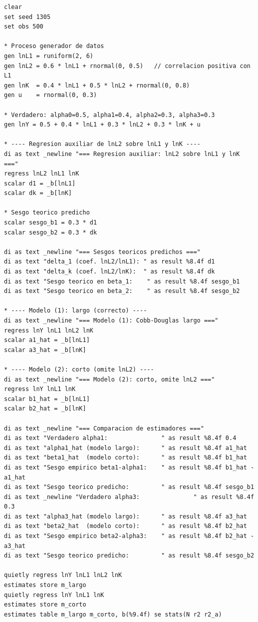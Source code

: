 \documentclass[12pt, letterpaper]{article}
\begin{document}
\begin{lstlisting}[caption={Simulación del sesgo por variable omitida ($\alpha_2 = 0.3$)}]
clear
set seed 1305
set obs 500

* Proceso generador de datos
gen lnL1 = runiform(2, 6)
gen lnL2 = 0.6 * lnL1 + rnormal(0, 0.5)   // correlacion positiva con L1
gen lnK  = 0.4 * lnL1 + 0.5 * lnL2 + rnormal(0, 0.8)
gen u    = rnormal(0, 0.3)

* Verdadero: alpha0=0.5, alpha1=0.4, alpha2=0.3, alpha3=0.3
gen lnY = 0.5 + 0.4 * lnL1 + 0.3 * lnL2 + 0.3 * lnK + u

* ---- Regresion auxiliar de lnL2 sobre lnL1 y lnK ----
di as text _newline "=== Regresion auxiliar: lnL2 sobre lnL1 y lnK ==="
regress lnL2 lnL1 lnK
scalar d1 = _b[lnL1]
scalar dk = _b[lnK]

* Sesgo teorico predicho
scalar sesgo_b1 = 0.3 * d1
scalar sesgo_b2 = 0.3 * dk

di as text _newline "=== Sesgos teoricos predichos ==="
di as text "delta_1 (coef. lnL2/lnL1): " as result %8.4f d1
di as text "delta_k (coef. lnL2/lnK):  " as result %8.4f dk
di as text "Sesgo teorico en beta_1:    " as result %8.4f sesgo_b1
di as text "Sesgo teorico en beta_2:    " as result %8.4f sesgo_b2

* ---- Modelo (1): largo (correcto) ----
di as text _newline "=== Modelo (1): Cobb-Douglas largo ==="
regress lnY lnL1 lnL2 lnK
scalar a1_hat = _b[lnL1]
scalar a3_hat = _b[lnK]

* ---- Modelo (2): corto (omite lnL2) ----
di as text _newline "=== Modelo (2): corto, omite lnL2 ==="
regress lnY lnL1 lnK
scalar b1_hat = _b[lnL1]
scalar b2_hat = _b[lnK]

di as text _newline "=== Comparacion de estimadores ==="
di as text "Verdadero alpha1:               " as result %8.4f 0.4
di as text "alpha1_hat (modelo largo):      " as result %8.4f a1_hat
di as text "beta1_hat  (modelo corto):      " as result %8.4f b1_hat
di as text "Sesgo empirico beta1-alpha1:    " as result %8.4f b1_hat - a1_hat
di as text "Sesgo teorico predicho:         " as result %8.4f sesgo_b1
di as text _newline "Verdadero alpha3:               " as result %8.4f 0.3
di as text "alpha3_hat (modelo largo):      " as result %8.4f a3_hat
di as text "beta2_hat  (modelo corto):      " as result %8.4f b2_hat
di as text "Sesgo empirico beta2-alpha3:    " as result %8.4f b2_hat - a3_hat
di as text "Sesgo teorico predicho:         " as result %8.4f sesgo_b2

quietly regress lnY lnL1 lnL2 lnK
estimates store m_largo
quietly regress lnY lnL1 lnK
estimates store m_corto
estimates table m_largo m_corto, b(%9.4f) se stats(N r2 r2_a)
\end{lstlisting}
\end{document}
